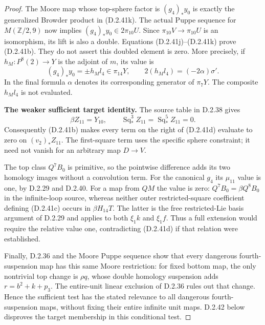 \begin{proof}
The Moore map whose top-sphere factor is $(g_4)_*y_0$ is
exactly the generalized Browder product in
\textup{(D.2.41k)}. The actual Puppe sequence for
$M(\mathbb Z/2,9)$ now implies
$(g_4)_*y_0\in2\pi_{10}U$. Since $\pi_{10}V\to\pi_{10}U$
is an isomorphism, its lift is also a double. Equations
\textup{(D.2.41j)--(D.2.41k)} prove \textup{(D.2.41b)}.
They do not assert this doubled element is zero. More precisely,
if $h_M:P^8(2)\to Y$ is the adjoint of $m$, its value is
\[
 (g_4)_*y_0=\pm h_Ml_4\in\pi_{14}Y,
 \qquad 2(h_Ml_4)=(-2\alpha)\sigma'.
 \tag{D.2.41l}
\]
In the final formula $\alpha$ denotes its corresponding
generator of $\pi_7Y$. The composite $h_Ml_4$ is not evaluated.

\medskip\noindent
\textbf{The weaker sufficient target identity.}
The source table in D.2.38 gives
\[
 \beta Z_{11}=Y_{10},\qquad
 \operatorname{Sq}_*^3Z_{11}
   =\operatorname{Sq}_*^5Z_{11}=0.
 \tag{D.2.41m}
\]
Consequently \textup{(D.2.41b)} makes every term on the
right of \textup{(D.2.41d)} evaluate to zero on
$(v_2)_*Z_{11}$. The first-square term uses the specific
sphere constraint; it need not vanish for an arbitrary map
$D\to V$.

The top class $Q^7B_0$ is primitive, so the pointwise difference
adds its two homology images without a convolution term.
For the canonical $g_4$ its $\mu_{11}$ value is one, by
D.2.29 and D.2.40. For a map from $QM$ the value is zero:
$Q^7B_0=\beta Q^8B_0$ in the infinite-loop source, whereas
neither outer restricted-square coefficient defining
\textup{(D.2.41c)} occurs in $\beta H_{14}T$. The latter is
the free restricted-Lie basis argument of D.2.29 and applies
to both $\xi_1k$ and $\xi_1f$. Thus a full extension would
require the relative value one, contradicting
\textup{(D.2.41d)} if that relation were established.

Finally, D.2.36 and the Moore Puppe sequence show that every
dangerous fourth-suspension map has this same Moore restriction:
for fixed bottom map, the only nontrivial top change is
$\rho q$, whose double homology suspension adds
$r=b^2+k+p_3$. The entire-unit linear exclusion of D.2.36
rules out that change. Hence the sufficient test has the
stated relevance to all dangerous fourth-suspension maps,
without fixing their entire infinite unit maps. D.2.42 below
disproves the target membership in this conditional test.
\end{proof}
